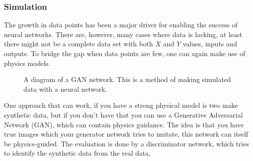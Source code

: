 \documentclass[12pt,a4paper]{article} %
\numberwithin{equation}{section}
\begin{document}
		\subsubsection{Simulation}		
			The growth in data points has been a major driver for enabling the success of neural networks. There are, however, many cases where data is lacking, at least there might not be a complete data set with both $X$ and $Y$ values, inputs and outputs. To bridge the gap when data points are few, one can again make use of physics models.
			
			\begin{figure}
				\centering
				\caption{A diagram of a GAN network. This is a method of making simulated data with a neural network.}
				\label{fig:gan}
			\end{figure}
			
			One approach that can work, if you have a strong physical model is two make synthetic data, but if you don't have that you can use a Generative Adversarial Network (GAN), which can contain physics guidance. The idea is that you have true images which your generator network tries to imitate, this network can itself be physics-guided. The evaluation is done by a discriminator network, which tries to identify the synthetic data from the real data,
			
\end{document}
